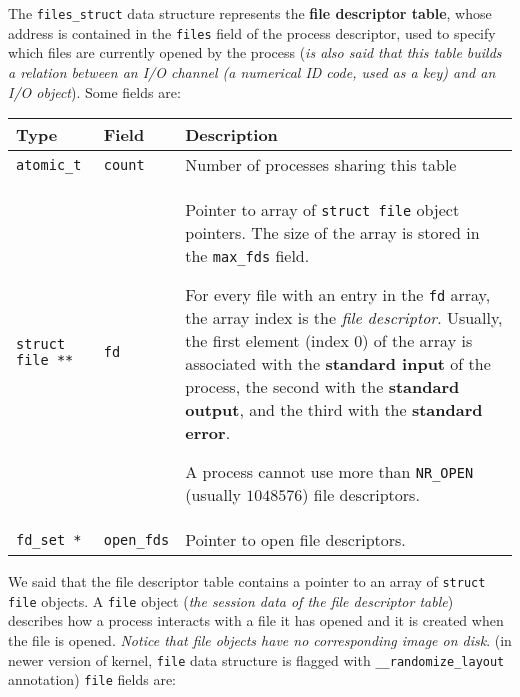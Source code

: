 \documentclass[10pt,a4paper]{article}
\begin{document}
The \texttt{files\_struct} data structure represents the \textbf{file descriptor table}, whose address is contained in the \texttt{files} field of the process descriptor, used to specify which files are currently opened by the process (\textit{is also said that this table builds a relation between an I/O channel (a numerical ID code, used as a key) and an I/O object}). Some fields are:

\begin{center}
\begin{tabular}{l|l|p{13cm}} 

\toprule
Type & Field & Description \\
\midrule

\texttt{atomic\_t} & \texttt{count} & Number of processes sharing this table

\\

\texttt{struct file **} & \texttt{fd} & Pointer to array of \texttt{struct file} object pointers. The size of the array is stored in the \texttt{max\_fds} field. 

For every file with an entry in the \texttt{fd} array, the array index is the \textit{file descriptor}. Usually, the first element (index 0) of the array is associated with the \textbf{standard input} of the process, the second with the \textbf{standard output}, and the third with the \textbf{standard error}.

A process cannot use more than \texttt{NR\_OPEN} (usually $1048576$) file descriptors.

\\

\texttt{fd\_set *} & \texttt{open\_fds} & Pointer to open file descriptors.

\\
 
\bottomrule
\end{tabular}
\end{center}

We said that the file descriptor table contains a pointer to an array of \texttt{struct file} objects.
A \texttt{file} object (\textit{the session data of the file descriptor table}) describes how a process interacts with a file it has opened and it is created when the file is opened. \textit{Notice that file objects have no corresponding image on disk}. (in newer version of kernel, \texttt{file} data structure is flagged with \texttt{\_\_randomize\_layout} annotation) \texttt{file} fields are:
\end{document}
